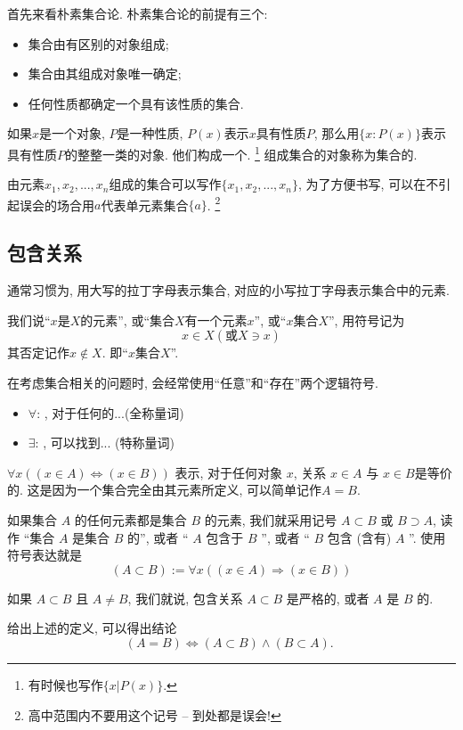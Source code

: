 \documentclass{ctexart}
\begin{document}
首先来看朴素集合论. 朴素集合论的前提有三个: 

\begin{itemize}
    \item 集合由有区别的对象组成;
    \item 集合由其组成对象唯一确定; 
    \item 任何性质都确定一个具有该性质的集合.
\end{itemize}

如果$x$是一个对象, $P$是一种性质, $P(x)$表示$x$具有性质$P$, 那么用$\{ x:P(x) \}$表示具有性质$P$的整整一类的对象. 他们构成一个. \footnote{有时候也写作$\{ x | P(x) \}$.}
组成集合的对象称为集合的. 

由元素$x_1, x_2, ..., x_n$组成的集合可以写作$\{ x_1, x_2, ..., x_n \}$, 为了方便书写, 可以在不引起误会的场合用$a$代表单元素集合$\{ a \}$. \footnote{高中范围内不要用这个记号 -- 到处都是误会!}

\subsection{包含关系} 通常习惯为, 用大写的拉丁字母表示集合, 对应的小写拉丁字母表示集合中的元素. 

我们说``$x$是$X$的元素'', 或``集合$X$有一个元素$x$'', 或``$x$集合$X$'', 用符号记为
\[
x \in X ( \text{或} X \ni x)
\]
其否定记作$x \notin X$. 即``$x$集合$X$''.

在考虑集合相关的问题时, 会经常使用``任意''和``存在''两个逻辑符号. 
\begin{itemize}
    \item $\forall$: , 对于任何的...(全称量词)
    \item $\exists$: , 可以找到... (特称量词)
\end{itemize} 

$\forall x((x \in A) \Leftrightarrow(x \in B))$ 表示, 对于任何对象 $x$, 关系 $x \in A$ 与 $x \in B$是等价的. 这是因为一个集合完全由其元素所定义, 可以简单记作$A=B$. 

如果集合 $A$ 的任何元素都是集合 $B$ 的元素, 我们就采用记号 $A \subset B$ 或 $B \supset A$, 读作 “集合 $A$ 是集合 $B$ 的”, 或者 “ $A$ {包含于} $B$ ”, 或者 “ $B$ 包含 (含有) $A$ ”. 使用符号表达就是
$$
(A \subset B):=\forall x((x \in A) \Rightarrow(x \in B))
$$

如果 $A \subset B$ 且 $A \neq B$, 我们就说, 包含关系 $A \subset B$ 是严格的, 或者 $A$ 是 $B$ 的.

给出上述的定义, 可以得出结论
$$
(A=B) \Leftrightarrow(A \subset B) \wedge(B \subset A) \text {. }
$$
\end{document}
